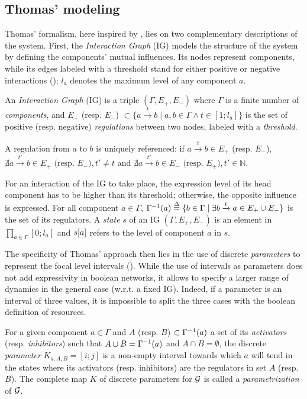 \subsection{Thomas' modeling}
Thomas' formalism, here inspired by \cite{Richard06,BernotSemBRN}, lies on two complementary descriptions of the system.
First, the \emph{Interaction Graph} (IG) models the structure of the system by defining the components' mutual influences.
Its nodes represent components, while its edges labeled with a threshold stand for either positive or negative interactions ();
$l_a$ denotes the maximum level of any component $a$.

\begin{definition}
\label{def:ig}
An \emph{Interaction Graph} (IG) is a triple $(\Gamma, E_+, E_-)$ where $\Gamma$ is a finite number of \emph{components},
and $E_+$ (resp. $E_-$) $\subset \{a \xrightarrow{t} b \mid a, b \in \Gamma \wedge t \in [1; l_a]\}$
is the set of positive (resp. negative) \emph{regulations} between two nodes, labeled with a \emph{threshold}.

A regulation from $a$ to $b$ is uniquely referenced:
if $a \xrightarrow{t} b \in E_+$ (resp. $E_-$),
$\nexists a \xrightarrow{t'} b \in E_+ \text{ (resp. $E_-$)}, t' \neq t$
and $\nexists a \xrightarrow{t'} b \in E_-\text{ (resp. $E_+$)}, t' \in \mathbb{N}$.
\end{definition}

\noindent
For an interaction of the IG to take place, the expression level of its head component has to be higher than its threshold; otherwise, the opposite influence is expressed.
For all component $a \in \Gamma$, $\Gamma^{-1}(a) \stackrel{\Delta}= \{ b\in\Gamma\mid \exists b\xrightarrow t a\in E_+\cup E_- \}$
is the set of its regulators.
A \emph{state} $s$ of an IG $(\Gamma, E_+, E_-)$ is an element in $\prod_{a \in \Gamma} [0;l_a]$
and ${s[a]}$ refers to the level of component $a$ in $s$.

The specificity of Thomas' approach then lies in the use of discrete \emph{parameters} to represent the focal level intervals ().
While the use of intervals as parameters does not add expressivity in boolean networks, it allows to specify a larger range of dynamics in the general case (w.r.t. a fixed IG).
Indeed, if a parameter is an interval of three values, it is impossible to split the three cases with the boolean definition of resources.

\begin{definition}\label{def:param}
For a given component $a \in \Gamma$ and $A$ (resp. $B$) $\subset \Gamma^{-1}(a)$ a set of its \emph{activators} (resp. \emph{inhibitors}) such that $A \cup B = \Gamma^{-1}(a)$ and $A \cap B = \emptyset$,
the discrete \emph{parameter} $K_{a,A,B} = [i; j]$ is a non-empty interval towards which $a$ will tend
in the states where its activators (resp. inhibitors) are the regulators in set $A$ (resp. $B$).
The complete map $K$ of discrete parameters for $\mathcal{G}$ is called a \emph{parametrization} of $\mathcal{G}$.
\end{definition}

